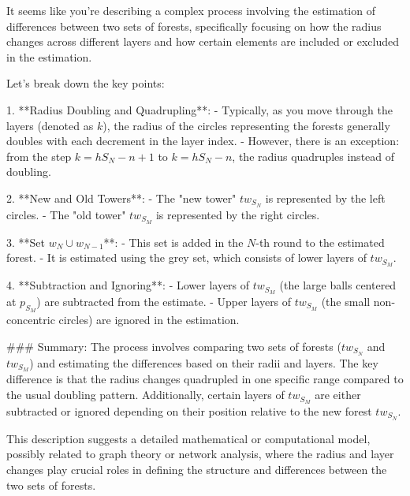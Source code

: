 It seems like you're describing a complex process involving the estimation of differences between two sets of forests, specifically focusing on how the radius changes across different layers and how certain elements are included or excluded in the estimation.

Let's break down the key points:

1. **Radius Doubling and Quadrupling**: 
   - Typically, as you move through the layers (denoted as \(k\)), the radius of the circles representing the forests generally doubles with each decrement in the layer index.
   - However, there is an exception: from the step \(k = hS_N - n + 1\) to \(k = hS_N - n\), the radius quadruples instead of doubling.

2. **New and Old Towers**:
   - The "new tower" \(tw_{S_N}\) is represented by the left circles.
   - The "old tower" \(tw_{S_M}\) is represented by the right circles.

3. **Set \(w_N \cup w_{N-1}\)**:
   - This set is added in the \(N\)-th round to the estimated forest.
   - It is estimated using the grey set, which consists of lower layers of \(tw_{S_M}\).

4. **Subtraction and Ignoring**:
   - Lower layers of \(tw_{S_M}\) (the large balls centered at \(p_{S_M}\)) are subtracted from the estimate.
   - Upper layers of \(tw_{S_M}\) (the small non-concentric circles) are ignored in the estimation.

### Summary:
The process involves comparing two sets of forests (\(tw_{S_N}\) and \(tw_{S_M}\)) and estimating the differences based on their radii and layers. The key difference is that the radius changes quadrupled in one specific range compared to the usual doubling pattern. Additionally, certain layers of \(tw_{S_M}\) are either subtracted or ignored depending on their position relative to the new forest \(tw_{S_N}\).

This description suggests a detailed mathematical or computational model, possibly related to graph theory or network analysis, where the radius and layer changes play crucial roles in defining the structure and differences between the two sets of forests.